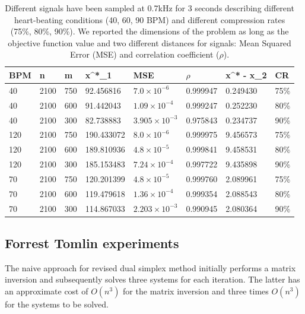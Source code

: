 \documentclass[journal,article,submit,electronics,pdftex]{Definitions/mdpi}
\newcommand{\norm}[1]{\left\lVert#1\right\rVert}
\begin{document}
{\begin{table}[htb]
    \centering
    \begin{tabular}{@{}llllllll@{}}
        \toprule
        BPM & n & m & \norm{x^*}_1 & MSE & $\rho$ & \norm{x^* - x}_2 & CR \\
        \midrule
        40 & 2100 & 750 &  92.456816 & $7.0 \times 10^{-6}$ & 0.999947 &
        0.249430 & 75\%  \\
        40 & 2100 & 600 &  91.442043 & $1.09 \times 10^{-4}$ & 0.999247 & 0.252230 & 80\%  \\
        40 & 2100 & 300 &  82.738883 & $3.905 \times 10^{-3}$ & 0.975843 & 0.234737 & 90\%  \\
        120 & 2100 & 750 &  190.433072 & $8.0 \times 10^{-6}$ & 0.999975 & 9.456573 & 75\%  \\
        120 & 2100 & 600 &  189.810936 & $4.8 \times 10^{-5}$ & 0.999841 & 9.458531 & 80\%  \\
        120 & 2100 & 300 &  185.153483 & $7.24 \times 10^{-4}$ & 0.997722 & 9.435898 & 90\% \\
        70 & 2100 & 750 &  120.201399 & $4.8 \times 10^{-5}$ & 0.999760 & 2.089961 & 75\% \\
        70 & 2100 & 600 &   119.479618 & $1.36 \times 10^{-4}$ & 0.999354 & 2.088543 & 80\%  \\
        70 & 2100 & 300 & 114.867033 & $2.203 \times 10^{-3}$ & 0.990945 & 2.080364 & 90\% \\
        \bottomrule
    \end{tabular}
    \caption{Different signals have been sampled at 0.7kHz for 3 seconds describing different heart-beating conditions (40, 60, 90 BPM) and different compression rates (75\%, 80\%, 90\%). We reported the dimensions of the problem as long as the objective function value and two different distances for signals: Mean Squared Error (MSE) and correlation coefficient ($\rho$).}
    \label{table:ecg}
\end{table}

\clearpage
\subsection{Forrest Tomlin experiments}

The naive approach for revised dual simplex method initially performs a matrix inversion and subsequently solves three systems for each iteration. The latter has an approximate cost of $O(n^3)$ for the matrix inversion and three times $O(n^3)$ for the systems to be solved.

}
\end{document}
